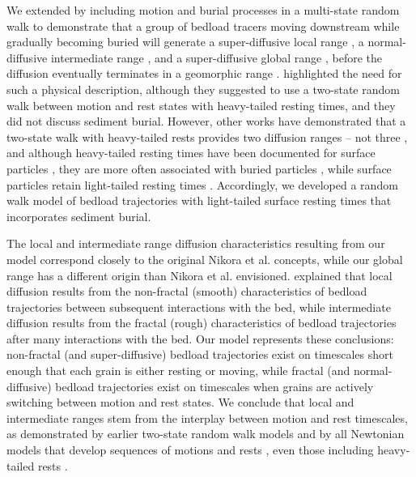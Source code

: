 We extended \citet{Einstein1937} by including motion and burial processes in a multi-state random walk \citep{Weiss1994,Weeks1998} to demonstrate that a group of bedload tracers moving downstream while gradually becoming buried will generate a super-diffusive local range \citep{Martin2012,Fathel2016,Witz2018}, a normal-diffusive intermediate range \citep{Nakagawa1976,Yano1969}, and a super-diffusive global range \citep{Bradley2017, Bradley2010}, before the diffusion eventually terminates in a geomorphic range \citep{Hassan2017}.
\citet{Nikora2002} highlighted the need for such a physical description, although they suggested to use a two-state random walk between motion and rest states with heavy-tailed resting times, and they did not discuss sediment burial.
However, other works have demonstrated that a two-state walk with heavy-tailed rests provides two diffusion ranges -- not three \citep{Weeks1996,Fan2016}, and although heavy-tailed resting times have been documented for surface particles \citep{Liu2019,Fraccarollo2019}, they are more often associated with buried particles \citep{Martin2012,Martin2014,Voepel2013,Olinde2015,Pelosi2016, Pierce2020}, while surface particles retain light-tailed resting times \citep{Einstein1937,Yano1969,Ancey2006,Nakagawa1976}.
Accordingly, we developed a random walk model of bedload trajectories with light-tailed surface resting times that incorporates sediment burial.

The local and intermediate range diffusion characteristics resulting from our model correspond closely to the original Nikora et al. concepts, while our global range has a different origin than Nikora et al. envisioned.
\citet{Nikora2001a} explained that local diffusion results from the non-fractal (smooth) characteristics of bedload trajectories between subsequent interactions with the bed,  while intermediate diffusion results from the fractal (rough) characteristics of bedload trajectories after many interactions with the bed.
Our model represents these conclusions: non-fractal (and super-diffusive) bedload trajectories exist on timescales short enough that each grain is either resting or moving, while fractal (and normal-diffusive) bedload trajectories exist on timescales when grains are actively switching between motion and rest states.
We conclude that local and intermediate ranges stem from the interplay between motion and rest timescales, as demonstrated by earlier two-state random walk models \citep{Lisle1998,Lajeunesse2017} and by all Newtonian models that develop sequences of motions and rests \citep{Nikora2001a, Bialik2012}, even those including heavy-tailed rests \citep{Fan2016}. 

